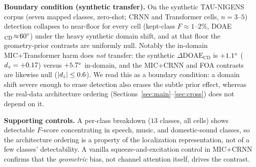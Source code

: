 \textbf{Boundary condition (synthetic transfer).} On the synthetic TAU-NIGENS
corpus (seven mapped classes, zero-shot; CRNN and Transformer cells, $n=3$--$5$)
detection collapses to near-floor for every cell (kept-class
$F\!\approx\!1$--$2\%$, DOAE$_\mathrm{CD}\!\approx\!60^\circ$) under the heavy
synthetic domain shift, and at that floor the geometry-prior contrasts are
uniformly null. Notably the in-domain MIC+Transformer harm does \emph{not}
transfer: the synthetic $\Delta\text{DOAE}_\mathrm{CD}$ is $+1.1^\circ$
($d_z=+0.17$) versus $+5.7^\circ$ in-domain, and the MIC+CRNN and FOA contrasts
are likewise null ($|d_z|\le0.6$). We read this as a boundary condition: a domain
shift severe enough to erase detection also erases the subtle prior effect,
whereas the real-data architecture ordering (Sections~\ref{sec:main}--\ref{sec:cross})
does not depend on it.

\textbf{Supporting controls.} A per-class breakdown ($13$ classes, all cells)
shows detectable $F$-score concentrating in speech, music, and domestic-sound
classes, so the architecture ordering is a property of the localization
representation, not of a few classes' detectability. A vanilla
squeeze-and-excitation control in MIC+CRNN confirms that the \emph{geometric}
bias, not channel attention itself, drives the contrast.

